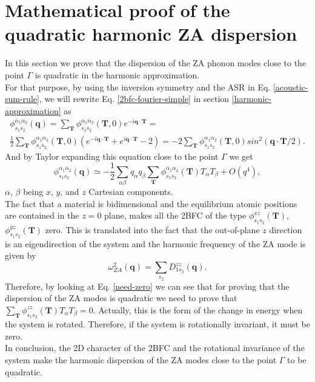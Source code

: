 
\chapter{Mathematical proof of the quadratic harmonic ZA dispersion} %

\label{quadratic-dispersion} %

In this section we prove that the dispersion of the ZA phonon modes close to the point $\Gamma$ is quadratic in the
harmonic approximation. \\

For that purpose, by using the inversion symmetry and the ASR in Eq. \ref{acoustic-sum-rule}, we will rewrite 
Eq. \ref{2bfc-fourier-simple} in section \ref{harmonic-approximation} as
\begin{multline}
 \phi_{s_{1}s_{2}}^{\alpha_{1}\alpha_{2}}(\mathbf{q})=\sum_{\mathbf{T}}\phi_{s_{1}s_{2}}^{\alpha_{1}\alpha_{2}}(\mathbf{T},0)e^{-i\mathbf{q}\cdot\mathbf{T}}=\\\frac{1}{2}\sum_{\mathbf{T}}\phi_{s_{1}s_{2}}^{\alpha_{1}\alpha_{2}}(\mathbf{T},0)(e^{-i\mathbf{q}\cdot\mathbf{T}}+e^{i\mathbf{q}\cdot\mathbf{T}}-2)=-2\sum_{\mathbf{T}}\phi_{s_{1}s_{2}}^{\alpha_{1}\alpha_{2}}(\mathbf{T},0)sin^{2}(\mathbf{q}\cdot\mathbf{T}/2).
\end{multline}
And by Taylor expanding this equation close to the point $\Gamma$ we get
\begin{equation}
\label{need-zero}
\phi_{s_{1}s_{2}}^{\alpha_{1}\alpha_{2}}(\mathbf{q})\simeq -\frac{1}{2}\sum_{\alpha\beta}q_{\alpha}q_{\beta}\sum_{\mathbf{T}}\phi_{s_{1}s_{2}}^{\alpha_{1}\alpha_{2}}(\mathbf{T})T_{\alpha}T_{\beta}+O(q^{4}),
\end{equation}
$\alpha$, $\beta$ being $x$, $y$, and $z$ Cartesian components. \\

The fact that a material is bidimensional and the equilibrium atomic positions are contained in the $z=0$ plane,
makes all the 2BFC of the type $\phi_{s_{1}s_{2}}^{xz}(\mathbf{T})$, $\phi_{s_{1}s_{2}}^{yz}(\mathbf{T})$ zero. This 
is translated into the fact that the out-of-plane $z$ direction is an eigendirection of the system and the
harmonic frequency of the ZA mode is given by
\begin{equation}
\omega_{ZA}^{2}(\mathbf{q})=\sum_{s_{2}}D_{1s_{2}}^{zz}(\mathbf{q}).
\end{equation}
Therefore, by looking at Eq. \ref{need-zero} we can see that for proving that the dispersion of the ZA modes is quadratic we need to prove that
$\sum_{\mathbf{T}}\phi_{s_{1}s_{2}}^{zz}(\mathbf{T})T_{\alpha}T_{\beta}=0$. Actually, this is the form of the change 
in energy when the system is rotated. Therefore, if the system is rotationally invariant, it must be zero. \\

In conclusion, the 2D character of the 2BFC and the rotational invariance of the system make the harmonic dispersion of the ZA modes close to the point $\Gamma$ to be quadratic.
